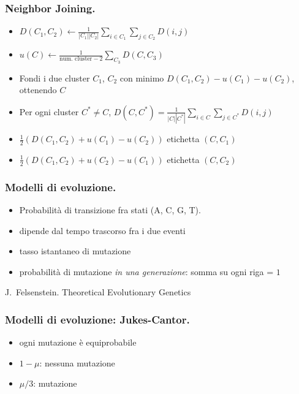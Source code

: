 \begin{frame}[fragile]
\frametitle{Neighbor Joining.}
\begin{itemize}
\item
  $D(C_{1}, C_{2}) \gets \frac{1}{|C_{1}||C_{2}|}\sum_{i\in C_{1}}\sum_{j\in C_{2}} D(i,j)$
\item
  $u(C) \gets \frac{1}{\text{num. cluster} - 2} \sum_{C_{3}} D(C,C_{3})$
\item
  Fondi i due cluster $C_{1}$, $C_{2}$ con minimo $D(C_{1}, C_{2}) - u(C_{1}) -u(C_{2})$, ottenendo $C$
\item
  Per ogni cluster $C^{*}\neq C$, $D(C, C^{*}) = \frac{1}{|C||C^{*}|}\sum_{i\in C}\sum_{j\in C^{*}} D(i,j)$
\item
  $\frac{1}{2}\left(D(C_{1}, C_{2}) + u(C_{1}) - u(C_{2})\right)$ etichetta $(C, C_{1})$
\item
  $\frac{1}{2}\left(D(C_{1}, C_{2}) + u(C_{2}) - u(C_{1})\right)$ etichetta $(C, C_{2})$
\end{itemize}
\end{frame}

\begin{frame}[fragile]
  \frametitle{Modelli di evoluzione.}
\begin{itemize}
\item
  Probabilità di transizione fra stati (A, C, G, T).
\item
  dipende dal tempo trascorso fra i due eventi
\item
  tasso istantaneo di mutazione
\item
  probabilità di mutazione \emph{in una generazione}: somma su ogni riga = $1$
\end{itemize}

J.~Felsenstein.
%
 Theoretical Evolutionary Genetics
\end{frame}

\begin{frame}[fragile]
  \frametitle{Modelli di evoluzione: Jukes-Cantor.}
\begin{itemize}
\item
  ogni mutazione è equiprobabile
\item
  $1-\mu$: nessuna mutazione
\item
  $\mu/3$: mutazione
\end{itemize}
\end{frame}

